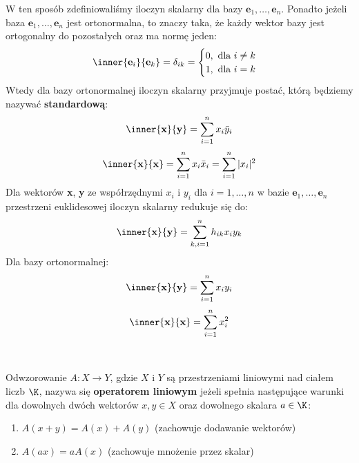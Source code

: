 W ten sposób zdefiniowaliśmy iloczyn skalarny dla bazy $\textbf{e}_1, \ldots, \textbf{e}_n$. Ponadto jeżeli baza $\textbf{e}_1, \ldots, \textbf{e}_n$ jest ortonormalna, to znaczy taka, że każdy wektor bazy jest ortogonalny do pozostałych oraz ma normę jeden:
\begin{equation}\label{eq:def_ortonormal_base}
    \inner{\textbf{e}_i}{\textbf{e}_k} = \delta_{ik} = \begin{cases}
    0, \text{ dla } i \neq k \\
    1, \text{ dla } i = k
\end{cases}
\end{equation}
Wtedy dla bazy ortonormalnej iloczyn skalarny przyjmuje postać, którą będziemy nazywać \textbf{standardową}:
\begin{equation}\label{eq:std_normal_inner}
    \inner{\textbf{x}}{\textbf{y}} = \sum_{i=1}^{n}{x_{i} \bar{y}_{i}}
\end{equation}
\begin{equation}
    \inner{\textbf{x}}{\textbf{x}} = \sum_{i=1}^{n}{x_{i} \bar{x}_{i}} = \sum_{i=1}^{n}{|x_{i}|^2}
\end{equation}
Dla wektorów \textbf{x}, \textbf{y} ze współrzędnymi $x_i$ i $y_i$ dla $i = 1, \ldots, n$ w bazie $\textbf{e}_1, \ldots, \textbf{e}_n$
przestrzeni euklidesowej iloczyn skalarny redukuje się do:
\begin{equation}\label{eq:std_euclid_inner}
    \inner{\textbf{x}}{\textbf{y}} = \sum_{k,i=1}^{n}{h_{ik} x_{i} {y}_{k}}
\end{equation}
Dla bazy ortonormalnej:
\begin{equation}\label{eq:std_euclid_normal_inner}
    \inner{\textbf{x}}{\textbf{y}} = \sum_{i=1}^{n}{x_{i} {y}_{i}}
\end{equation}
\begin{equation}
    \inner{\textbf{x}}{\textbf{x}} = \sum_{i=1}^{n}{x_{i}^2}
\end{equation}

\

\begin{definition}
Odwzorowanie $A \colon X \to Y $, gdzie $X$ i $Y$ są przestrzeniami liniowymi nad ciałem liczb $\K$, nazywa się \textbf{operatorem liniowym} jeżeli spełnia następujące warunki dla dowolnych dwóch wektorów $x, y \in X$ oraz dowolnego skalara $a \in \K$:
\begin{enumerate}[leftmargin=1cm, itemsep=2pt, label=(\arabic*)]
    \item $A(x + y) = A(x) + A(y)$ (zachowuje dodawanie wektorów)
    \item $A(ax) = aA(x)$ (zachowuje mnożenie przez skalar)
\end{enumerate}
\end{definition}

